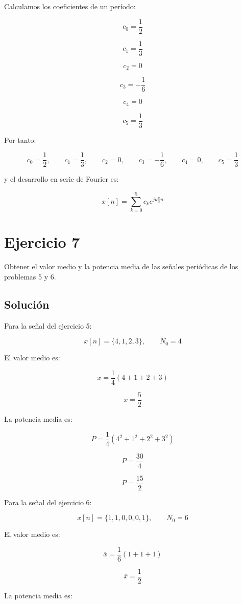 \documentclass[fleqn]{article}
\begin{document}
	Calculamos los coeficientes de un período:

	\[
	c_0=\frac{1}{2}
	\]

	\[
	c_1=\frac{1}{3}
	\]

	\[
	c_2=0
	\]

	\[
	c_3=-\frac{1}{6}
	\]

	\[
	c_4=0
	\]

	\[
	c_5=\frac{1}{3}
	\]

	Por tanto:

	\[
	\boxed{
	c_0=\frac{1}{2},
	\qquad
	c_1=\frac{1}{3},
	\qquad
	c_2=0,
	\qquad
	c_3=-\frac{1}{6},
	\qquad
	c_4=0,
	\qquad
	c_5=\frac{1}{3}
	}
	\]

	y el desarrollo en serie de Fourier es:

	\[
	\boxed{
	x[n]
	=
	\sum_{k=0}^{5}
	c_k e^{jk\frac{\pi}{3}n}
	}
	\]

\section{Ejercicio 7}
	Obtener el valor medio y la potencia media de las señales periódicas de los problemas 5 y 6.

	\subsection{Solución}

	Para la señal del ejercicio 5:

	\[
	x[n]=\{4,1,2,3\},
	\qquad
	N_0=4
	\]

	El valor medio es:

	\[
	\overline{x}
	=
	\frac{1}{4}(4+1+2+3)
	\]

	\[
	\boxed{
	\overline{x}=\frac{5}{2}
	}
	\]

	La potencia media es:

	\[
	P
	=
	\frac{1}{4}
	\left(
	4^2+1^2+2^2+3^2
	\right)
	\]

	\[
	P
	=
	\frac{30}{4}
	\]

	\[
	\boxed{
	P=\frac{15}{2}
	}
	\]

	Para la señal del ejercicio 6:

	\[
	x[n]=\{1,1,0,0,0,1\},
	\qquad
	N_0=6
	\]

	El valor medio es:

	\[
	\overline{x}
	=
	\frac{1}{6}(1+1+1)
	\]

	\[
	\boxed{
	\overline{x}=\frac{1}{2}
	}
	\]

	La potencia media es:
\end{document}
